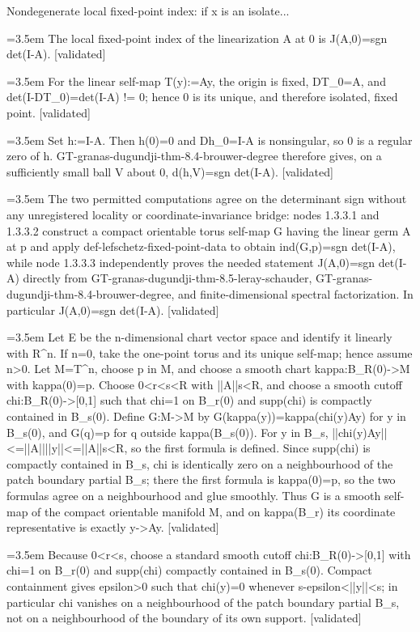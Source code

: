 \documentclass{article}
\newcommand{\step}[1]{\par\noindent\hangindent=3.5em\hangafter=1%
  \makebox[3.5em][l]{\textbf{#1.}}}
\newcommand{\steptag}[1]{\hfill{\small\textsf{[#1]}}}
\begin{document}
\begin{proofbox}{Nondegenerate local fixed-point index: if x is an isolate...}
\step{1.3} The local fixed-point index of the linearization A at 0 is J(A,0)=sgn det(I-A). \steptag{validated} \\[6pt]
\step{1.3.1} For the linear self-map T(y):=Ay, the origin is fixed, DT\_0=A, and det(I-DT\_0)=det(I-A) != 0; hence 0 is its unique, and therefore isolated, fixed point. \steptag{validated} \\[4pt]
\step{1.3.2} Set h:=I-A. Then h(0)=0 and Dh\_0=I-A is nonsingular, so 0 is a regular zero of h. GT-granas-dugundji-thm-8.4-brouwer-degree therefore gives, on a sufficiently small ball V about 0, d(h,V)=sgn det(I-A). \steptag{validated} \\[4pt]
\step{1.3.3} The two permitted computations agree on the determinant sign without any unregistered locality or coordinate-invariance bridge: nodes 1.3.3.1 and 1.3.3.2 construct a compact orientable torus self-map G having the linear germ A at p and apply def-lefschetz-fixed-point-data to obtain ind(G,p)=sgn det(I-A), while node 1.3.3.3 independently proves the needed statement J(A,0)=sgn det(I-A) directly from GT-granas-dugundji-thm-8.5-leray-schauder, GT-granas-dugundji-thm-8.4-brouwer-degree, and finite-dimensional spectral factorization. In particular J(A,0)=sgn det(I-A). \steptag{validated} \\[6pt]
\step{1.3.3.1} Let E be the n-dimensional chart vector space and identify it linearly with R\textasciicircum{}n. If n=0, take the one-point torus and its unique self-map; hence assume n>0. Let M=T\textasciicircum{}n, choose p in M, and choose a smooth chart kappa:B\_R(0)->M with kappa(0)=p. Choose 0<r<s<R with ||A||s<R, and choose a smooth cutoff chi:B\_R(0)->[0,1] such that chi=1 on B\_r(0) and supp(chi) is compactly contained in B\_s(0). Define G:M->M by G(kappa(y))=kappa(chi(y)Ay) for y in B\_s(0), and G(q)=p for q outside kappa(B\_s(0)). For y in B\_s, ||chi(y)Ay||<=||A||||y||<=||A||s<R, so the first formula is defined. Since supp(chi) is compactly contained in B\_s, chi is identically zero on a neighbourhood of the patch boundary partial B\_s; there the first formula is kappa(0)=p, so the two formulas agree on a neighbourhood and glue smoothly. Thus G is a smooth self-map of the compact orientable manifold M, and on kappa(B\_r) its coordinate representative is exactly y->Ay. \steptag{validated} \\[6pt]
\step{1.3.3.1.1} Because 0<r<s, choose a standard smooth cutoff chi:B\_R(0)->[0,1] with chi=1 on B\_r(0) and supp(chi) compactly contained in B\_s(0). Compact containment gives epsilon>0 such that chi(y)=0 whenever s-epsilon<||y||<s; in particular chi vanishes on a neighbourhood of the patch boundary partial B\_s, not on a neighbourhood of the boundary of its own support. \steptag{validated} \\[4pt]

\end{proofbox}
\end{document}
